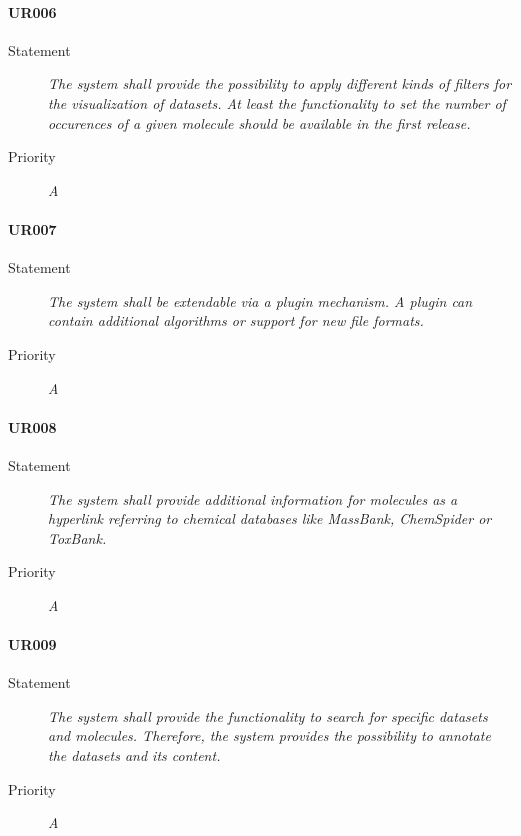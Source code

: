\paragraph{UR006}
\begin{description}
    \item[Statement]
        \textit{The system shall provide the possibility to apply different kinds of filters for the visualization of datasets. At least the functionality to set the number of occurences of a given molecule should be available in the first release.}
    \item [Priority] \textit{A}
\end{description}

\paragraph{UR007}
\begin{description}
    \item[Statement]
        \textit{The system shall be extendable via a plugin mechanism. A plugin can contain additional algorithms or support for new file formats.}
    \item [Priority] \textit{A}
\end{description}

\paragraph{UR008}
\begin{description}
    \item[Statement]
        \textit{The system shall provide additional information for molecules as a hyperlink referring to chemical databases like MassBank, ChemSpider or ToxBank.}
    \item [Priority] \textit{A}
\end{description}

\paragraph{UR009}
\begin{description}
    \item[Statement]
        \textit{The system shall provide the functionality to search for specific datasets and molecules. Therefore, the system provides the possibility to annotate the datasets and its content.}
    \item [Priority] \textit{A}
\end{description}

